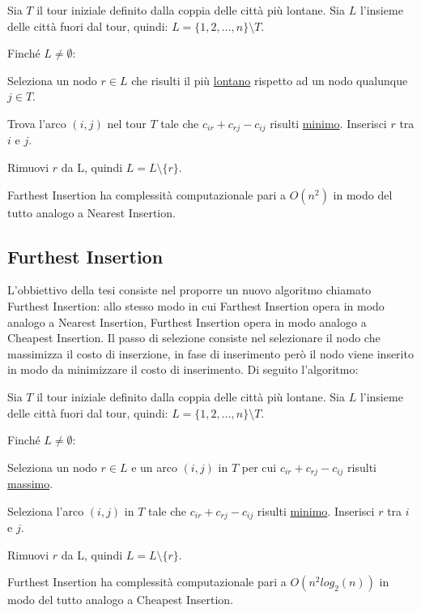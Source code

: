 \documentclass[a4paper,12pt]{report}
\begin{document}
\begin{tcolorbox}[colframe=black,colback=white,boxrule=0.5pt, sharp corners]
\begin{legal}
  \item Sia $T$ il tour iniziale definito dalla coppia delle città più lontane. Sia $L$ l'insieme delle città fuori dal tour, quindi: $L = \{1, 2, ..., n\} \setminus T$.
  \item Finché $L \neq \emptyset$:
  \begin{legal}
    \item Seleziona un nodo $r \in L$ che risulti il più \underline{lontano} rispetto ad un nodo qualunque $j \in T$.
    \item Trova l'arco $(i, j)$ nel tour $T$ tale che $c_{ir} + c_{rj} - c_{ij}$ risulti \underline{minimo}. Inserisci $r$ tra $i$ e $j$.  
    \item Rimuovi $r$ da L, quindi $L = L \setminus \{r\}$.
  \end{legal}
\end{legal}
\end{tcolorbox}
\hfill \break Farthest Insertion ha complessità computazionale pari a $O(n^2)$ in modo del tutto analogo a Nearest Insertion.

\subsection{Furthest Insertion}
L'obbiettivo della tesi consiste nel proporre un nuovo algoritmo chiamato Furthest Insertion: allo stesso modo in cui Farthest Insertion opera in modo analogo a Nearest Insertion, Furthest Insertion opera in modo analogo a Cheapest Insertion. Il passo di selezione consiste nel selezionare il nodo che massimizza il costo di inserzione, in fase di inserimento però il nodo viene inserito in modo da minimizzare il costo di inserimento. Di seguito l'algoritmo:

\begin{tcolorbox}[colframe=black,colback=white,boxrule=0.5pt, sharp corners]
\begin{legal}
  \item Sia $T$ il tour iniziale definito dalla coppia delle città più lontane. Sia $L$ l'insieme delle città fuori dal tour, quindi: $L = \{1, 2, ..., n\} \setminus T$.
  \item Finché $L \neq \emptyset$:
  \begin{legal}
    \item Seleziona un nodo $r \in L$ e un arco $(i, j)$ in $T$ per cui $c_{ir} + c_{rj} - c_{ij}$ risulti \underline{massimo}.
    \item Seleziona l'arco $(i, j)$ in $T$ tale che $c_{ir} + c_{rj} - c_{ij}$ risulti \underline{minimo}. Inserisci $r$ tra $i$ e $j$.
    \item Rimuovi $r$ da L, quindi $L = L \setminus \{r\}$.
  \end{legal}
\end{legal}
\end{tcolorbox}
\hfill \break Furthest Insertion ha complessità computazionale pari a $O(n^2 log_2(n))$ in modo del tutto analogo a Cheapest Insertion.
\end{document}
